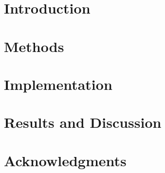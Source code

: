 \documentclass[fleqn,10pt]{SelfArx} %
\affiliation{\textsuperscript{1}\textit{Department of Computer Science}} %
\begin{document}
\flushbottom %

\maketitle %

\tableofcontents %

\thispagestyle{empty} %


\section*{Introduction} %




\section{Methods}


\section{Implementation}

\section{Results and Discussion}



\section*{Acknowledgments} %



\nocite{*}



\end{document}
